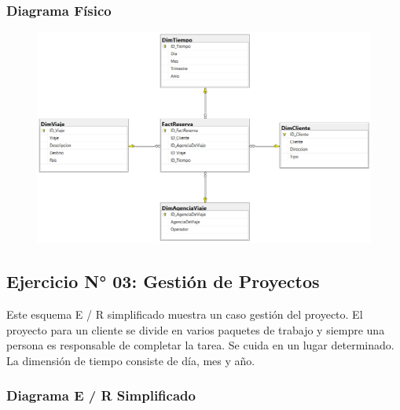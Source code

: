 \documentclass{article}
\begin{document}
\newpage
\subsubsection{\textbf{Diagrama Físico }}

	\begin{figure}[htb]
		\begin{center}
			\includegraphics[width=15cm]{./images/Ejercicio2_DiagramaFisico}
			
		\end{center}
	\end{figure}

\newpage


\subsection{Ejercicio N° 03: Gestión de Proyectos}

Este esquema E / R simplificado muestra un caso gestión del proyecto. El proyecto para un cliente se divide en varios paquetes de trabajo y siempre una persona es responsable de completar la tarea. Se cuida en un lugar determinado. La dimensión de tiempo consiste de día, mes y año.

\subsubsection{\textbf{Diagrama E / R Simplificado}}
\end{document}
